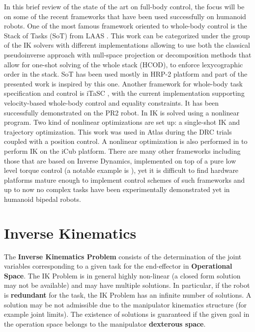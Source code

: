 In this brief review of the state of the art on full-body control, the focus will be on some of the recent frameworks that have been used successfully on humanoid robots. One of the most famous framework oriented to whole-body control is the Stack of Tasks (SoT) from LAAS \cite{Mansard:09}. This work can be categorized under the group of the IK solvers with different implementations allowing to use both the classical pseudoinverse approach with null-space projection or decomposition methods that allow for one-shot solving of the whole stack (HCOD), to enforce lexycographic order in the stack. SoT has been used mostly in HRP-2 platform and part of the presented work is inspired by this one. 
Another framework for whole-body task specification and control is iTaSC \cite{Smits:09},  with the current implementation supporting velocity-based whole-body control and equality constraints. It has been successfully demonstrated on the PR2 robot.
In \cite{Fallon:14} IK is solved using a nonlinear program. Two kind of nonlinear optimizations are set up: a single-shot IK and trajectory optimization. This work was used in Atlas during the DRC trials coupled with a position control.
A nonlinear optimization is also performed in \cite{Pattacini:10} to perform IK on the iCub platform.
There are many other frameworks including those that are based on Inverse Dynamics, implemented on top of a pure low level torque control (a notable example is \cite{Sentis:10}), yet it is difficult to find hardware platforms mature enough to implement control schemes of such frameworks and up to now no complex tasks have been experimentally demonstrated yet in humanoid bipedal robots.


\section{Inverse Kinematics}
\label{sec:robot-Cartesian-control:inverse-kinematics}
The \textbf{Inverse Kinematics Problem} consists of the determination of the joint variables corresponding to a given task for the end-effector in \textbf{Operational Space}. The IK Problem is in general highly non-linear (a closed form solution may not be available) and may have multiple solutions. In particular, if the robot is \textbf{redundant} for the task, the IK Problem has an infinite number of solutions. A solution may be not admissible due to the manipulator kinematics structure (for example joint limits). The existence of solutions is guaranteed if the given goal in the operation space belongs to the manipulator \textbf{dexterous space}.

